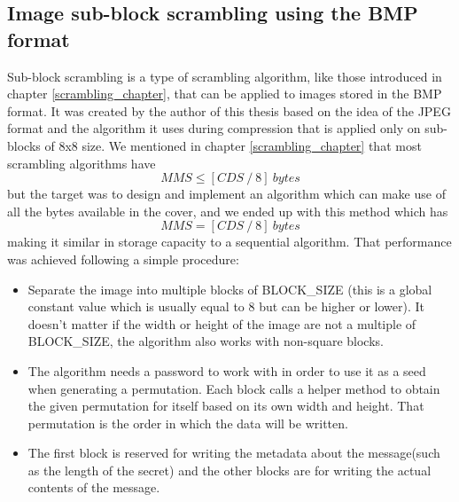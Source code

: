 \begin{multicols}{2}
\subsection{Image sub-block scrambling using the BMP format}
Sub-block scrambling is a type of scrambling algorithm, like those introduced in chapter \ref{scrambling_chapter}, that can be applied to images stored in the BMP format. It was created by the author of this thesis based on the idea of the JPEG format and the algorithm it uses during compression that is applied only on sub-blocks of 8x8 size. We mentioned in chapter \ref{scrambling_chapter} that most scrambling algorithms have \[ MMS \leq [CDS \ / \ 8] \ bytes \] but the target was to design and implement an algorithm which can make use of all the bytes available in the cover, and we ended up with this method which has 
\begin{equation} \label{eq:1}
MMS = [CDS \ / \ 8] \ bytes
\end{equation}
 making it similar in storage capacity to a sequential algorithm. That performance was achieved following a simple procedure:
\begin{itemize}
  \item Separate the image into multiple blocks of BLOCK\_SIZE (this is a global constant value which is usually equal to 8 but can be higher or lower). It doesn't matter if the width or height of the image are not a multiple of BLOCK\_SIZE, the algorithm also works with non-square blocks.
  \item The algorithm needs a password to work with in order to use it as a seed when generating a permutation. Each block calls a helper method to obtain the given permutation for itself based on its own width and height. That permutation is the order in which the data will be written.
  \item The first block is reserved for writing the metadata about the message(such as the length of the secret) and the other blocks are for writing the actual contents of the message.
\end{itemize}

\end{multicols}


